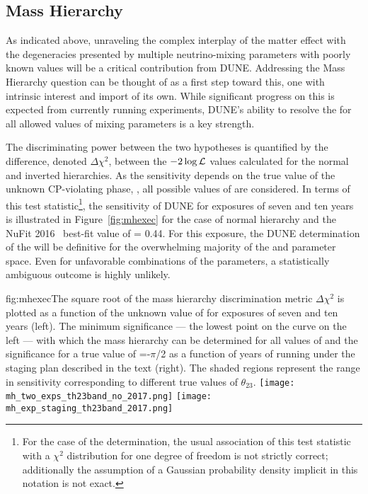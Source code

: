 \subsection{Mass Hierarchy}
\label{sec:exec-summ-physics-mh-cpv}

As indicated above, unraveling the complex interplay of the matter effect with the degeneracies presented by multiple neutrino-mixing parameters with poorly known values will be a critical contribution from DUNE. Addressing the Mass Hierarchy question can be thought of as a first step toward this, one with intrinsic interest and import of its own.  While significant progress on this is expected from currently running experiments, DUNE's ability to resolve the  for all allowed values of mixing parameters is a key strength.

The discriminating power between the two  hypotheses is quantified
by the difference, denoted $\Delta \chi^2$, between the
$-2\log{\cal L}$ values calculated for the normal and inverted
hierarchies. As the sensitivity depends on the true value of the unknown
CP-violating phase, \deltacp, all possible values of \deltacp are
considered.  In terms of this test statistic\footnote{For the case of the  determination, the usual
  association of this test statistic with a $\chi^2$ distribution for
  one degree of freedom is not strictly correct; additionally the assumption of a
  Gaussian probability density 
  implicit in this notation is not exact.}, the 
sensitivity of DUNE for exposures of seven and ten years is
illustrated in Figure~\ref{fig:mhexec} for the case of normal
hierarchy and the NuFit 2016~\cite{Esteban:2016qun} best-fit value of  = 0.44. 
For this exposure, the DUNE determination of the  will be definitive for
the overwhelming majority of the  \deltacp and  parameter space.
Even for unfavorable combinations of the parameters, a statistically
ambiguous outcome is highly unlikely.  
\begin{dunefigure}{fig:mhexec}{The
    square root of the mass hierarchy discrimination metric $\Delta
    \chi^2$ is plotted as a function of the unknown value of \deltacp
    for exposures of seven and ten years  
    (left).  The minimum significance
    --- the lowest point on the curve on the left --- with which the mass
    hierarchy can be determined for all values of \deltacp and the significance for a true value of \deltacp=-$\pi$/2 as a
    function of years of running under the staging plan described in the text (right).
    The shaded regions represent the range in sensitivity corresponding to
    different true values of $\theta_{23}$.}
\texttt{[image: mh\_two\_exps\_th23band\_no\_2017.png]}
\texttt{[image: mh\_exp\_staging\_th23band\_2017.png]}
\end{dunefigure}


